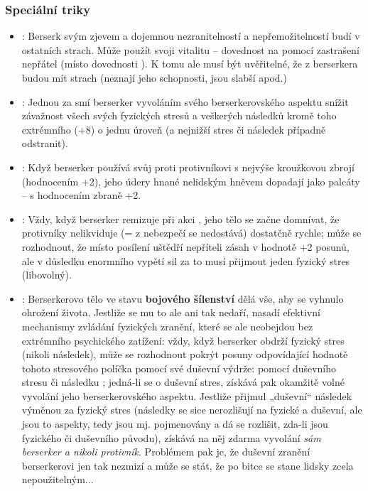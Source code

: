 \documentclass[../main.tex]{subfiles}
\begin{document}
\subsubsection*{Speciální triky}
\begin{itemize}
\item {}: Berserk svým zjevem a dojemnou nezranitelností a nepřemožitelností budí v ostatních strach. Může použít svoji vitalitu – dovednost  na  pomocí zastrašení nepřátel (místo dovednosti ). K tomu ale musí být uvěřitelné, že z berserkera budou mít strach (neznají jeho schopnosti, jsou slabší apod.)
\item {}: Jednou za  smí berserker vyvoláním svého berserkerovského aspektu snížit závažnost všech svých fyzických stresů a veškerých následků kromě toho extrémního (+8) o jednu úroveň (a nejnižší stres či následek případně odstranit).
\item {}: Když berserker používá svůj  proti protivníkovi s nejvýše kroužkovou zbrojí (hodnocením +2), jeho údery hnané nelidským hněvem dopadají jako palcáty – s hodnocením zbraně +2. 
\item {}: Vždy, když berserker remizuje při akci , jeho tělo se začne domnívat, že protivníky nelikviduje (= z nebezpečí se nedostává) dostatčně rychle; může se rozhodnout, že místo posílení uštědří nepříteli zásah v hodnotě +2 posunů, ale v důsledku enormního vypětí sil za to musí přijmout jeden fyzický stres (libovolný).
\item {}: Berserkerovo tělo ve stavu \textbf{bojového šílenství}
 dělá vše, aby se vyhnulo ohrožení života. Jestliže se mu to ale ani tak nedaří, nasadí efektivní mechanismy zvládání fyzických zranění, které se ale neobejdou bez extrémního psychického zatížení: vždy, když berserker obdrží fyzický stres (nikoli následek), může se rozhodnout pokrýt posuny odpovídající hodnotě tohoto stresového políčka pomocí své duševní výdrže: pomocí duševního stresu či následku ; jedná-li se o duševní stres, získává pak okamžitě volné vyvolání jeho berserkerovského aspektu. Jestliže přijmul „duševní“ následek výměnou za fyzický stres (následky se sice nerozlišují na fyzické a duševní, ale jsou to aspekty, tedy jsou mj. pojmenovány a dá se rozlišit, zda-li jsou fyzického či duševního původu), získává na něj zdarma vyvolání \textit{sám berserker a nikoli protivník}. Problémem pak je, že duševní zranění berserkerovi jen tak nezmizí a může se stát, že po bitce se stane lidsky zcela nepoužitelným... 



\end{itemize}
\end{document}
